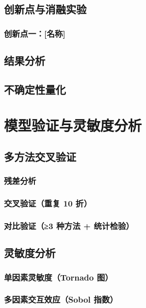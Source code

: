 \documentclass[12pt,a4paper]{article}
\begin{document}
\subsection{创新点与消融实验}  %
\subsubsection{创新点一：[名称]}  %

\subsection{结果分析}  %

\subsection{不确定性量化}  %


\section{模型验证与灵敏度分析}
\subsection{多方法交叉验证}
\subsubsection{残差分析}
\subsubsection{交叉验证（重复 10 折）}
\subsubsection{对比验证（≥3 种方法 + 统计检验）}
\subsection{灵敏度分析}
\subsubsection{单因素灵敏度（Tornado 图）}
\subsubsection{多因素交互效应（Sobol 指数）}
\end{document}
